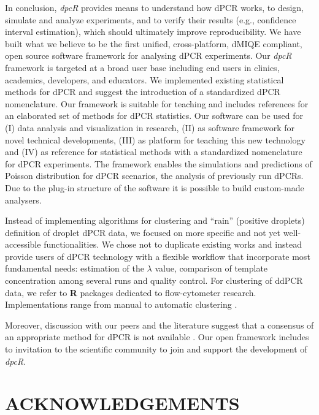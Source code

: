 \documentclass[a4,center,fleqn]{NAR}
\begin{document}
In conclusion, \textit{dpcR} provides means to understand how dPCR works, to 
design, simulate and analyze experiments, and to verify their results (e.g., 
confidence interval estimation), which should ultimately improve 
reproducibility. We have built what we believe to be the first unified, 
cross-platform, dMIQE compliant, open source software framework for analysing 
dPCR experiments. Our \textit{dpcR} framework is targeted at a broad user base 
including end users in clinics, academics, developers, and educators. We 
implemented existing statistical methods for dPCR and suggest the introduction 
of a standardized dPCR nomenclature. Our framework is suitable for teaching and 
includes references for an elaborated set of methods for dPCR statistics. Our 
software can be used for (I) data analysis and visualization in research, (II) 
as software framework for novel technical developments, (III) as platform for 
teaching this new technology and (IV) as reference for statistical methods with 
a standardized nomenclature for dPCR experiments. The framework enables the 
simulations and predictions of Poisson distribution for dPCR scenarios, the 
analysis of previously run dPCRs. Due to the plug-in structure of the software 
it is possible to build custom-made analysers.

Instead of implementing algorithms for clustering and ``rain'' (positive 
droplets) definition of droplet dPCR data, we focused on more specific and not 
yet well-accessible functionalities. We chose not to duplicate existing works 
and instead provide users of dPCR technology with a flexible workflow that 
incorporate most fundamental needs: estimation of the $\lambda$ value, 
comparison of template concentration among several runs and quality control. For 
clustering of ddPCR data, we refer to \textbf{R} packages dedicated to 
flow-cytometer research. Implementations range from manual to automatic 
clustering \cite{le_meur_computational_2013, milbury_determining_2014, 
Malek15022015, trypsteen_ddpcrquant_2015}. 

Moreover, discussion with our peers 
and the literature suggest that a consensus of an appropriate method for dPCR is 
not available \cite{trypsteen_ddpcrquant_2015}.
Our open framework includes to invitation to the scientific community to join 
and support the development of \textit{dpcR}.


\section{ACKNOWLEDGEMENTS}
\end{document}
